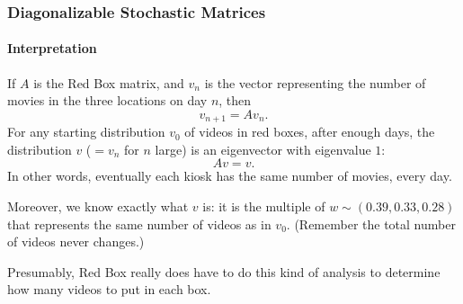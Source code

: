 
\begin{frame}
\frametitle{Diagonalizable Stochastic Matrices}
\framesubtitle{Interpretation}

If $A$ is the Red Box matrix, and $v_n$ is the vector 
representing the number of movies in the three locations on day $n$, then
\[ v_{n+1} = Av_n. \]
\pause
For any starting distribution $v_0$ of videos in red boxes, after enough
days, the distribution $v$ ($= v_n$ for $n$ large) is an eigenvector with
eigenvalue $1$:
\[ Av = v. \]
\pause
In other words, eventually each kiosk has the same number of movies, every day.

\pause\medskip
Moreover, we know exactly what $v$ is:
\pause
it is the multiple of
$w \sim (0.39, 0.33, 0.28)$ that represents the same number of videos
as in $v_0$.
\pause
(Remember the total number of videos never changes.)

\pause\bigskip
Presumably, Red Box really does have to do this kind of analysis to determine how many
videos to put in each box.

\end{frame}



